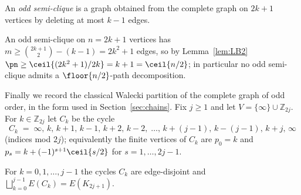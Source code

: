 \begin{definition}\label{def:osc}
An \emph{odd semi-clique} is a graph obtained from the complete graph on $2k+1$ vertices by
deleting at most $k-1$ edges.
\end{definition}

\begin{observation}\label{obs:density}
An odd semi-clique on $n=2k+1$ vertices has
$m\ge \binom{2k+1}{2}-(k-1)=2k^2+1$ edges, so by Lemma~\ref{lem:LB2}
$\pn\ge \ceil{(2k^2+1)/2k}=k+1=\ceil{n/2}$; in particular no odd semi-clique admits a
$\floor{n/2}$-path decomposition.
\end{observation}

Finally we record the classical Walecki partition of the complete graph of odd order, in the
form used in Section~\ref{sec:chains}. Fix $j\ge 1$ and let
$V=\{\infty\}\cup \mathbb{Z}_{2j}$. For $k\in\mathbb{Z}_{2j}$ let $C_k$ be the cycle
\[
C_k \;=\; \infty,\, k,\, k+1,\, k-1,\, k+2,\, k-2,\;\dots,\, k+(j-1),\, k-(j-1),\, k+j,\, \infty
\]
(indices mod $2j$); equivalently the finite vertices of $C_k$ are $p_0=k$ and
$p_s=k+(-1)^{s+1}\ceil{s/2}$ for $s=1,\dots,2j-1$.

\begin{lemma}\label{lem:walecki}
For $k=0,1,\dots,j-1$ the cycles $C_k$ are edge-disjoint and
$\bigsqcup_{k=0}^{j-1}E(C_k)=E(K_{2j+1})$.
\end{lemma}

